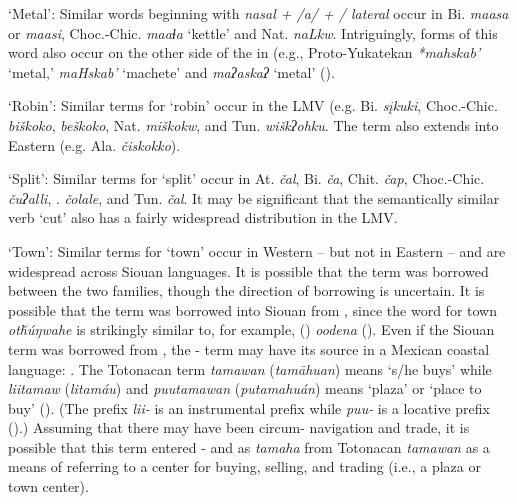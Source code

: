 \documentclass[output=paper]{LSP/langsci}
\begin{document}
\ea \parbox[t]{.9\textwidth} {`Metal': Similar words beginning with \emph{nasal + /a/ +  / lateral} occur in Bi. \emph{maasa} or \emph{maasi}, Choc.-Chic. \emph{maaɬa} `kettle' and Nat. \emph{naLkw}. Intriguingly, forms of this word also occur on the other side of the  in  (e.g., Proto-Yukatekan \emph{*mahskab’} `metal,'  \emph{maHskab’} `machete' and  \emph{maʔaskaʔ} `metal' (\citealt[208]{KaufmanJusteson2003}).}
\z

\ea  \parbox[t]{.9\textwidth}{`Robin': Similar terms for `robin' occur in the LMV (e.g. Bi. \emph{sįkuki}, Choc.-Chic. \emph{biškoko},  \emph{beškoko}, Nat. \emph{miškokw}, and Tun. \emph{wiškʔohku}. The term also extends into Eastern  (e.g. Ala. \emph{čiskokko}).}
\z

\ea \parbox[t]{.9\textwidth} {`Split': Similar terms for `split' occur in At. \emph{čal}, Bi. \emph{ča}, Chit. \emph{čap}, Choc.-Chic. \emph{čuʔalli}, . \emph{čolale}, and Tun. \emph{čal}. It may be significant that the semantically similar verb `cut' also has a fairly widespread distribution in the LMV.}
\z

\ea  \parbox[t]{.9\textwidth}{`Town': Similar terms for `town' occur in Western  -- but not in Eastern  -- and are widespread across Siouan languages. It is possible that the term was borrowed between the two families, though the direction of borrowing is uncertain. It is possible that the term was borrowed into Siouan from , since the  word for town \emph{otȟúŋwahe} is strikingly similar to, for example,  () \emph{oodena} (\citealt[272]{NicholsNyholm1995}). Even if the Siouan term was borrowed from , the - term may have its source in a Mexican  coastal language: . The Totonacan term \emph{tamawan} (\emph{tamāhuan}) means `s/he buys' while \emph{liitamaw} (\emph{litamáu}) and \emph{puutamawan} (\emph{putamahuán}) means `plaza' or `place to buy' (\citealt[110]{Aschmann1973}). (The  prefix \emph{lii-} is an instrumental prefix while \emph{puu-} is a locative prefix (\citealt[386,388]{MacKay1999}).) Assuming that there may have been circum- navigation and trade, it is possible that this term entered - and  as \emph{tamaha} from Totonacan \emph{tamawan} as a means of referring to a center for buying, selling, and trading (i.e., a plaza or town center).}
\z
\end{document}
